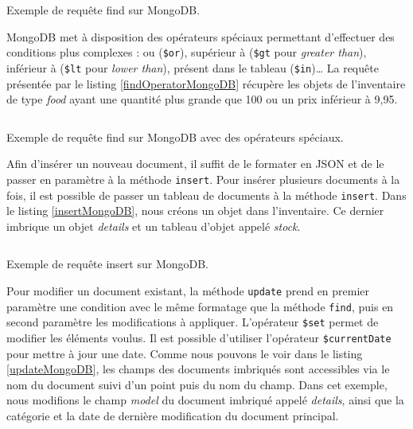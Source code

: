 	\begin{listing}[H]
		\inputminted{javascript}{code/requeteMongoFind.js}
		\caption{Exemple de requête find sur MongoDB.}
		\label{findMongoDB}
	\end{listing}

	MongoDB met à disposition des opérateurs spéciaux permettant d'effectuer des conditions plus complexes : ou (\verb|$or|), supérieur à (\verb|$gt| pour \textit{greater than}), inférieur à (\verb|$lt| pour \textit{lower than}), présent dans le tableau (\verb|$in|)\dots{} La requête présentée par le listing \ref{findOperatorMongoDB} récupère les objets de l'inventaire de type \textit{food} ayant une quantité plus grande que 100 ou un prix inférieur à 9,95.

	\begin{listing}[H]
		\inputminted{javascript}{code/requeteMongoFindOperator.js}
		\caption{Exemple de requête find sur MongoDB avec des opérateurs spéciaux.}
		\label{findOperatorMongoDB}
	\end{listing}

	Afin d'insérer un nouveau document, il suffit de le formater en JSON et de le passer en paramètre à la méthode \verb|insert|. Pour insérer plusieurs documents à la fois, il est possible de passer un tableau de documents à la méthode \verb|insert|. Dans le listing \ref{insertMongoDB}, nous créons un objet dans l'inventaire. Ce dernier imbrique un objet \textit{details} et un tableau d'objet appelé \textit{stock}.

	\begin{listing}[H]
		\inputminted{javascript}{code/requeteMongoInsert.js}
		\caption{Exemple de requête insert sur MongoDB.}
		\label{insertMongoDB}
	\end{listing}

	Pour modifier un document existant, la méthode \verb|update| prend en premier paramètre une condition avec le même formatage que la méthode \verb|find|, puis en second paramètre les modifications à appliquer. L'opérateur \verb|$set| permet de modifier les éléments voulus. Il est possible d'utiliser l'opérateur \verb|$currentDate| pour mettre à jour une date. Comme nous pouvons le voir dans le listing \ref{updateMongoDB}, les champs des documents imbriqués sont accessibles via le nom du document suivi d'un point puis du nom du champ. Dans cet exemple, nous modifions le champ \textit{model} du document imbriqué appelé \textit{details}, ainsi que la catégorie et la date de dernière modification du document principal.

